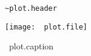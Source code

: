 \begin{figure}[!h]
\begin{plotbox}
\begin{Verbatim}[formatcom=\color{darkblue}]
~plot.header
\end{Verbatim}
\end{plotbox}
\begin{mdframed}[skipabove=0pt, topline=false]
\texttt{[image: ~plot.file]}
\caption{~plot.caption}
\label{~plot.label}
\end{mdframed}
\end{figure}
